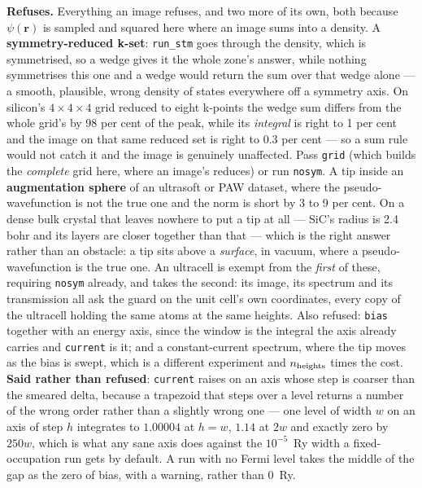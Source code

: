 \documentclass[11pt,a4paper]{article}
\newcommand{\code}[1]{\texttt{\small #1}}
\begin{document}
\begin{refuses}
\textbf{Refuses.} Everything an image refuses, and two more of its own, both
because $\psi(\mathbf r)$ is sampled and squared here where an image sums into a
density. A \textbf{symmetry-reduced k-set}: \code{run\_stm} goes through the
density, which is symmetrised, so a wedge gives it the whole zone's answer, while
nothing symmetrises this one and a wedge would return the sum over that wedge
alone --- a smooth, plausible, wrong density of states everywhere off a symmetry
axis. On silicon's $4\times4\times4$ grid reduced to eight k-points the wedge sum
differs from the whole grid's by 98 per cent of the peak, while its \emph{integral}
is right to 1 per cent and the image on that same reduced set is right to 0.3 per
cent --- so a sum rule would not catch it and the image is genuinely unaffected.
Pass \code{grid} (which builds the \emph{complete} grid here, where an image's
reduces) or run \code{nosym}. A tip inside an \textbf{augmentation
sphere} of an ultrasoft or PAW dataset, where the pseudo-wavefunction is not the
true one and the norm is short by 3 to 9 per cent. On a dense bulk crystal that
leaves nowhere to put a tip at all --- SiC's radius is 2.4 bohr and its layers
are closer together than that --- which is the right answer rather than an
obstacle: a tip sits above a \emph{surface}, in vacuum, where a pseudo-wavefunction
is the true one. An ultracell is exempt from the
\emph{first} of these, requiring \code{nosym} already, and takes the second:
its image, its spectrum and its transmission all ask the guard on the unit
cell's own coordinates, every copy of the ultracell holding the same atoms at
the same heights.
Also refused: \code{bias} together with an energy axis, since the window is the
integral the axis already carries and \code{current} is it; and a
constant-current spectrum, where the tip moves as the bias is swept, which is a
different experiment and $n_{\rm heights}$ times the cost.
\textbf{Said rather than refused}: \code{current} raises on an axis whose step is
coarser than the smeared delta, because a trapezoid that steps over a level
returns a number of the wrong order rather than a slightly wrong one --- one
level of width $w$ on an axis of step $h$ integrates to $1.00004$ at $h = w$,
$1.14$ at $2w$ and exactly zero by $250w$, which is what any sane axis does
against the $10^{-5}$~Ry width a fixed-occupation run gets by default. A run with
no Fermi level takes the middle of the gap as the zero of bias, with a warning,
rather than 0~Ry.
\end{refuses}
\end{document}
